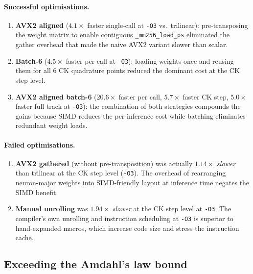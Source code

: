 \documentclass[11pt,a4paper]{article}
\begin{document}
\paragraph{Successful optimisations.}
\begin{enumerate}
    \item \textbf{AVX2 aligned} ($4.1\times$ faster single-call at
          \texttt{-O3} vs.\ trilinear): pre-transposing the weight matrix
          to enable contiguous \texttt{\_mm256\_load\_ps} eliminated the
          gather overhead that made the naive AVX2 variant slower than
          scalar.

    \item \textbf{Batch-6} ($4.5\times$ faster per-call at
          \texttt{-O3}): loading weights once and reusing them for all
          6 CK quadrature points reduced the dominant cost at the CK
          step level.

    \item \textbf{AVX2 aligned batch-6} ($20.6\times$ faster per call,
          $5.7\times$ faster CK step, $5.0\times$ faster full track at
          \texttt{-O3}): the combination of both strategies compounds
          the gains because SIMD reduces the per-inference cost while
          batching eliminates redundant weight loads.
\end{enumerate}

\paragraph{Failed optimisations.}
\begin{enumerate}
    \item \textbf{AVX2 gathered} (without pre-transposition) was
          actually $1.14\times$ \emph{slower} than trilinear at the CK
          step level (\texttt{-O3}).  The overhead of rearranging
          neuron-major weights into SIMD-friendly layout at inference
          time negates the SIMD benefit.

    \item \textbf{Manual unrolling} was $1.94\times$ \emph{slower} at
          the CK step level at \texttt{-O3}.  The compiler's own
          unrolling and instruction scheduling at \texttt{-O3} is
          superior to hand-expanded macros, which increase code size
          and stress the instruction cache.
\end{enumerate}


\subsection{Exceeding the Amdahl's law bound}
\end{document}
